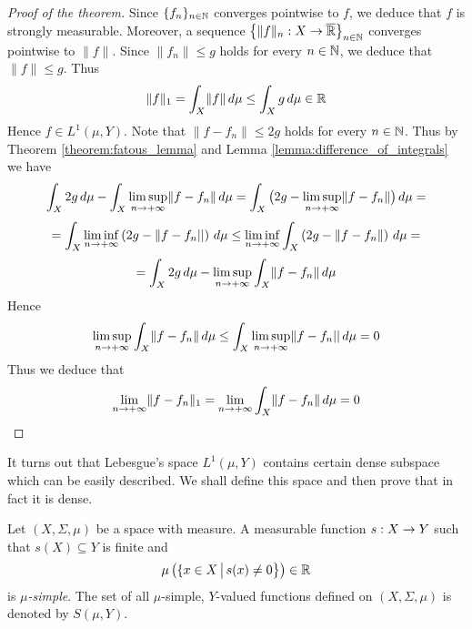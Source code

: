 \begin{proof}[Proof of the theorem]
Since $\{f_n\}_{n\in {\mathbb N}}$ converges pointwise to $f$, we deduce that $f$ is strongly measurable. Moreover, a sequence $\big\{\lVert f\rVert_n:X\rightarrow \overline{{\mathbb R}}\big\}_{n\in {\mathbb N}}$ converges pointwise to $\lVert f\rVert$. Since $\lVert f_n\rVert\leq g$ holds for every $n\in {\mathbb N}$, we deduce that $\lVert f\rVert\leq g$. Thus
$$\lVert f\rVert_1 = \int_X\lVert f\rVert\,d\mu \leq \int_Xg\,d\mu \in {\mathbb R}$$
Hence $f\in L^1(\mu, Y)$. Note that $\lVert f - f_n\rVert \leq 2g$ holds for every $n\in {\mathbb N}$. Thus by Theorem \ref{theorem:fatous_lemma} and Lemma \ref{lemma:difference_of_integrals} we have
$$\int_X2g\,d\mu - \int_X\limsup_{n\rightarrow +\infty}\lVert f-f_n\rVert\,d\mu  = \int_X \big(2g - \limsup_{n\rightarrow +\infty}\lVert f-f_n\rVert\big)\,d\mu = $$
$$= \int_X\liminf_{n\rightarrow +\infty}\left(2g - \lVert f-f_n||\right)\,d\mu \leq \liminf_{n\rightarrow +\infty}\int_X\left(2g - \lVert f- f_n\rVert\right)\,d\mu =$$
$$= \int_X 2g\,d\mu - \limsup_{n\rightarrow +\infty}\int_X \lVert f-f_n\rVert\,d\mu $$
Hence
$$\limsup_{n\rightarrow +\infty}\int_X\lVert f - f_n\rVert\,d\mu \leq \int_X\limsup_{n\rightarrow +\infty}\lVert f - f_n||\,d\mu = 0$$
Thus we deduce that
$$\lim_{n\rightarrow +\infty}\lVert f - f_n\rVert_1 = \lim_{n\rightarrow +\infty}\int_X\lVert f - f_n\rVert\,d\mu = 0$$
\end{proof}
\noindent
It turns out that Lebesgue's space $L^1(\mu, Y)$ contains certain dense subspace which can be easily described. We shall define this space and then prove that in fact it is dense.

\begin{definition}
Let $(X,\Sigma, \mu)$ be a space with measure. A measurable function $s:X\rightarrow Y$ such that $s(X)\subseteq Y$ is finite and
$$\mu\left(\{x\in X\,\big|\,s(x)\neq 0\big\}\right) \in {\mathbb R}$$
is \textit{$\mu$-simple}. The set of all $\mu$-simple, $Y$-valued functions defined on $(X,\Sigma, \mu)$ is denoted by $S(\mu, Y)$.
\end{definition}


